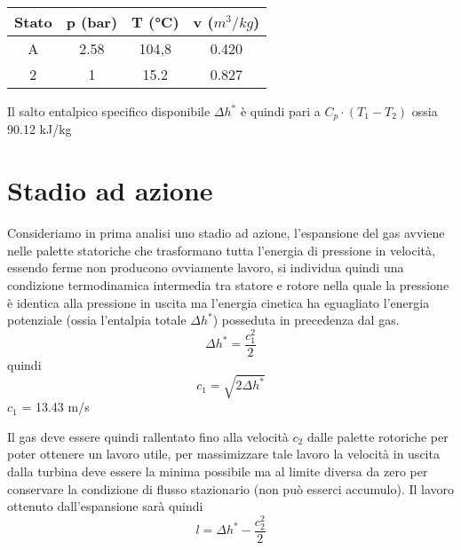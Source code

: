 \documentclass[a4paper,12pt]{article}
\begin{document}
\begin{center}
    \begin{tabular}{c|c|c|c}
        Stato   &p (bar)    &T (°C) &v ($m^3/kg$) \\ \hline
        A       &2.58       &104,8  &0.420  \\
        2       &1          &15.2   &0.827  
    \end{tabular}
\end{center}
Il salto entalpico specifico disponibile $\Delta h^*$ è quindi pari a $C_p \cdot (T_1-T_2)$ ossia 90.12 kJ/kg

\section{Stadio ad azione}
\label{sec:stadio_ad_azione}
Consideriamo in prima analisi uno stadio ad azione, l'espansione del gas avviene nelle palette statoriche che trasformano tutta l'energia di pressione in velocità,
essendo ferme non producono ovviamente lavoro, si individua quindi una condizione termodinamica intermedia tra statore e rotore nella quale la pressione è identica
alla pressione in uscita ma l'energia cinetica ha eguagliato l'energia potenziale (ossia l'entalpia totale $\Delta h^*$) posseduta in precedenza dal gas.
\begin{equation}
    \label{eq:entalpia_stadio_azione}
    \Delta h^* = \frac{c_1^2}{2}
\end{equation}
quindi
\begin{equation}
    \label{eq:vel_stadio_azione}
    c_1 = \sqrt{2\Delta h^*}    
\end{equation}
$c_1$ = 13.43 m/s

Il gas deve essere quindi rallentato fino alla velocità $c_2$ dalle palette rotoriche per poter ottenere un lavoro utile, per massimizzare tale lavoro la velocità
in uscita dalla turbina deve essere la minima possibile ma al limite diversa da zero per conservare la condizione di flusso stazionario (non può esserci accumulo).
Il lavoro ottenuto dall'espansione sarà quindi
\begin{equation}
    \label{eq:lavoro_ad_azione}
    l = \Delta h^* - \frac{c_2^2}{2}
\end{equation}
\end{document}
